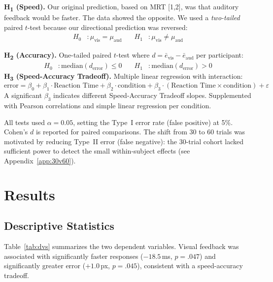 \documentclass[12pt,letterpaper]{article}
\begin{document}
\noindent\textbf{H\textsubscript{1} (Speed).} Our original prediction, based on MRT [1,2], was that auditory feedback would be faster. The data showed the opposite. We used a \emph{two-tailed} paired $t$-test because our directional prediction was reversed:
\vspace{-4pt}
\begin{align*}
  H_0 &: \mu_{\text{vis}} = \mu_{\text{aud}} &\quad H_1 &: \mu_{\text{vis}} \neq \mu_{\text{aud}}
\end{align*}

\noindent\textbf{H\textsubscript{2} (Accuracy).} One-tailed paired $t$-test where $d = \bar{e}_{\text{vis}} - \bar{e}_{\text{aud}}$ per participant:
\vspace{-4pt}
\begin{align*}
  H_0 &: \text{median}(d_{\text{error}}) \leq 0 &\quad H_1 &: \text{median}(d_{\text{error}}) > 0
\end{align*} 
\textbf{H\textsubscript{3} (Speed-Accuracy Tradeoff).} Multiple linear regression with interaction:
\[
  \text{error} = \beta_0 + \beta_1 \!\cdot\! \text{Reaction Time} + \beta_2 \!\cdot\! \text{condition} + \beta_3 \!\cdot\! (\text{Reaction Time} \times \text{condition}) + \varepsilon
\]
A significant $\beta_3$ indicates different Speed-Accuracy Tradeoff slopes. Supplemented with Pearson correlations and simple linear regression per condition.

All tests used $\alpha = 0.05$, setting the Type~I error rate (false positive) at 5\%. Cohen's $d$ is reported for paired comparisons. The shift from 30 to 60 trials was motivated by reducing Type~II error (false negative): the 30-trial cohort lacked sufficient power to detect the small within-subject effects (see Appendix~\ref{app:30v60}).


\section{Results}

\subsection{Descriptive Statistics}

Table~\ref{tab:dvs} summarizes the two dependent variables. Visual feedback was associated with significantly faster responses ($-18.5$\,ms, $p = .047$) and significantly greater error ($+1.0$\,px, $p = .045$), consistent with a speed-accuracy tradeoff.
\end{document}
